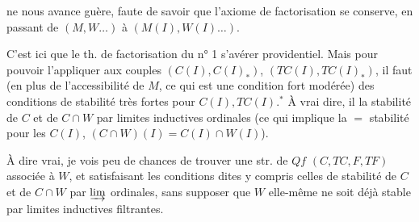 ne nous avance guère,  faute de savoir que l'axiome de factorisation se conserve, en passant de $(M,W\ldots)$ à $(M(I),W(I)\ldots)$.

C'est ici que le th. de factorisation du n° 1  s'avérer providentiel. Mais pour pouvoir l'appliquer aux couples $(C(I),C(I)_{*})$, $(TC(I),TC(I)_{*})$, il faut (en plus de l'accessibilité de $M$, ce qui est une condition fort modérée) des conditions de stabilité très fortes pour $C(I),TC(I)$.$^{*}$
À vrai dire, il  la stabilité de $C$ et de $C\cap W$ par limites inductives ordinales (ce qui implique la $=$ stabilité pour les $C(I)$,  $(C\cap W)(I)=C(I)\cap W(I)$).

À dire vrai, je vois peu de chances de trouver une str. de $Qf$ $(C,TC,F,TF)$ associée à $W$, et satisfaisant  les conditions dites y compris celles de stabilité de $C$ et de $C\cap W$ par $\varinjlim$ ordinales, sans supposer que $W$ elle-même ne soit déjà stable par  limites inductives filtrantes.
